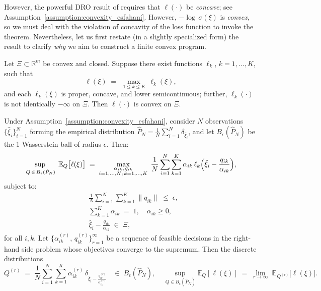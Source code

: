 However, the powerful DRO result of \citet{Esfahani2018DataDrivenDR} 
requires that \(\ell(\cdot)\) be \emph{concave}; see 
Assumption~\ref{assumption:convexity_esfahani}.  
However, $-\!\log\,\sigma(\xi)$ is \emph{convex}, 
so we must deal with the violation of concavity of the loss function to invoke the theorem.  
Nevertheless, let us first restate (in a slightly specialized form) 
the \citet{Esfahani2018DataDrivenDR} result to clarify \emph{why} we aim to 
construct a finite convex program.

\begin{assumption}
\label{assumption:convexity_esfahani}
Let $\Xi \subset \mathbb{R}^m$ be convex and closed.  
Suppose there exist functions $\ell_k$, $k=1,\ldots,K$, such that
\[
\ell(\xi)
\;=\;
\max_{\,1\le k\le K}\,\ell_k(\xi),
\]
and each $\ell_k(\xi)$ is proper, concave, and lower semicontinuous; further, 
$\ell_k(\cdot)$ is not identically $-\infty$ on $\Xi$.  
Then $\ell(\cdot)$ is convex on $\Xi$.
\end{assumption}

\begin{theorem}
\label{thm:worst_case_esfahani}
Under Assumption~\ref{assumption:convexity_esfahani}, 
consider $N$ observations $\{\hat{\xi}_i\}_{i=1}^N$ forming the empirical 
distribution $\hat{P}_N = \tfrac{1}{N}\sum_{i=1}^N \delta_{\hat{\xi}_i}$, 
and let $B_\epsilon(\hat{P}_N)$ be the 1-Wasserstein ball of radius $\epsilon$.  
Then:
\begin{equation}
\label{eq:esfahani_obj}
\sup_{\,Q \,\in\,B_\epsilon(\hat{P}_N)}\;
\mathbb{E}_{Q}\bigl[\ell(\xi)\bigr]
\;=\;
\max_{\substack{\alpha_{ik},\,q_{ik}\\i=1,\ldots,N;\,k=1,\ldots,K}}
\;
\frac{1}{N}
\sum_{i=1}^N
\sum_{k=1}^K
\alpha_{ik}\,\ell_k\Bigl(\hat{\xi}_i - \frac{q_{ik}}{\alpha_{ik}}\Bigr),
\end{equation}
subject to:
\begin{align}
\label{eq:esfahani_cons1}
&\frac{1}{N}\sum_{i=1}^N\sum_{k=1}^K \|q_{ik}\|\;\le\;\epsilon,
\\
\label{eq:esfahani_cons2}
&\sum_{k=1}^K \alpha_{ik} \;=\;1,\quad \alpha_{ik}\ge 0,
\\
\label{eq:esfahani_cons3}
&\hat{\xi}_i - \tfrac{q_{ik}}{\alpha_{ik}} \;\in\;\Xi,
\end{align}
for all $i,k$.  Let 
$\{\alpha_{ik}^{(r)},\,q_{ik}^{(r)}\}_{r=1}^\infty$ 
be a sequence of feasible decisions in the right-hand side problem whose 
objectives converge to the supremum.  Then the discrete distributions
\begin{equation}
\label{eq:esfahani_extremal}
Q^{(r)}
\;=\;
\frac{1}{N}\sum_{i=1}^N \sum_{k=1}^K
\alpha_{ik}^{(r)} \,\delta_{\hat{\xi}_i - \tfrac{q_{ik}^{(r)}}{\alpha_{ik}^{(r)}}}
\;\;\;\in\;B_\epsilon(\hat{P}_N),
\quad
\sup_{\,Q \in B_\epsilon(\hat{P}_N)}\mathbb{E}_Q[\ell(\xi)]
\;=\;
\lim_{r\to\infty}\;\mathbb{E}_{\,Q^{(r)}}\bigl[\ell(\xi)\bigr].
\end{equation}
\end{theorem}

